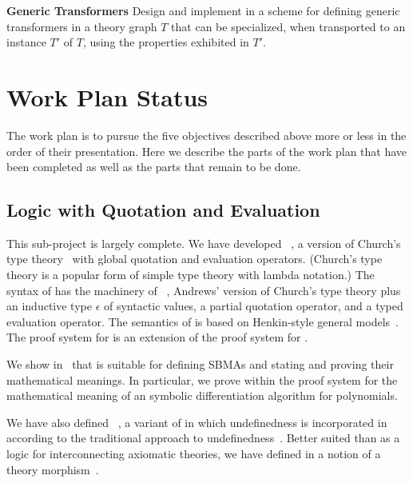 \documentclass[fleqn]{llncs}
\begin{document}
\medskip

  \item[]\textbf{Generic Transformers} Design and implement in  a
    scheme for defining generic transformers in a theory graph $T$
    that can be specialized, when transported to an instance $T'$ of
    $T$, using the properties exhibited in $T'$.

\ei


\section{Work Plan Status}

The work plan is to pursue the five objectives described above more or less in
the order of their presentation.  Here we describe the parts of the work
plan that have been completed as well as the parts that remain to be done.

\subsection*{Logic with Quotation and Evaluation}

This sub-project is largely complete.  We have developed
{\churchqe}~\cite{Farmer18}, a version of Church's type
theory~\cite{Church40} with global quotation and evaluation operators.
(Church's type theory is a popular form of simple type theory with
lambda notation.)  The syntax of {\churchqe} has the machinery of
{\qzero}~\cite{Andrews02}, Andrews' version of Church's type theory
plus an inductive type $\epsilon$ of syntactic values, a partial
quotation operator, and a typed evaluation operator.  The semantics of
{\churchqe} is based on Henkin-style general models~\cite{Henkin50}.
The proof system for {\churchqe} is an extension of the proof system
for {\qzero}.

We show in~\cite{Farmer18} that {\churchqe} is suitable for defining
SBMAs and stating and proving their mathematical meanings.  In
particular, we prove within the proof system for {\churchqe} the
mathematical meaning of an symbolic differentiation algorithm for
polynomials.

We have also defined {\churchuqe}~\cite{Farmer17}, a variant of
{\churchqe} in which undefinedness is incorporated in {\churchqe}
according to the traditional approach to
undefinedness~\cite{Farmer04}.  Better suited than {\churchqe} as a
logic for interconnecting axiomatic theories, we have defined in
{\churchuqe} a notion of a theory morphism~\cite{Farmer17}.
\end{document}
